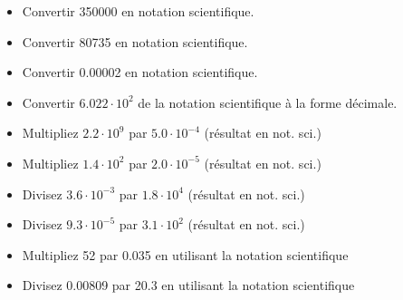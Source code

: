 \documentclass[
  11pt,
  a4paper,
  openany]{book}
\providecommand{\tightlist}{%
  \setlength{\itemsep}{0pt}\setlength{\parskip}{0pt}}
\begin{document}
\begin{Exercise}

\begin{itemize}
\tightlist
\item
  Convertir 350000 en notation scientifique.\\
\item
  Convertir 80735 en notation scientifique.\\
\item
  Convertir 0.00002 en notation scientifique.\\
\item
  Convertir \(6.022 \cdot 10^2\) de la notation scientifique à la forme décimale.\\
\item
  Multipliez \(2.2 \cdot 10^9\) par \(5.0 \cdot 10^{-4}\) (résultat en not. sci.)\\
\item
  Multipliez \(1.4 \cdot 10^2\) par \(2.0 \cdot 10^{-5}\) (résultat en not. sci.)\\
\item
  Divisez \(3.6 \cdot 10^{-3}\) par \(1.8 \cdot 10^4\) (résultat en not. sci.)\\
\item
  Divisez \(9.3 \cdot 10^{-5}\) par \(3.1 \cdot 10^2\) (résultat en not. sci.)\\
\item
  Multipliez 52 par 0.035 en utilisant la notation scientifique\\
\item
  Divisez 0.00809 par 20.3 en utilisant la notation scientifique\\
\end{itemize}

\end{Exercise}
\end{document}
